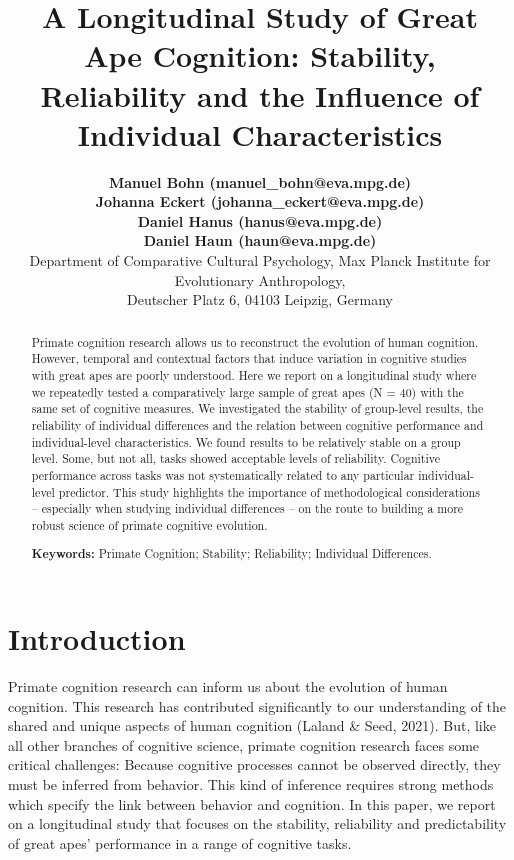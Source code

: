 \documentclass[10pt, letterpaper]{article}
\title{A Longitudinal Study of Great Ape Cognition: Stability, Reliability and
the Influence of Individual Characteristics}
\author{{\large \bf Manuel Bohn (manuel\_bohn@eva.mpg.de)} \\ {\large \bf Johanna Eckert (johanna\_eckert@eva.mpg.de)} \\ {\large \bf Daniel Hanus (hanus@eva.mpg.de)} \\ {\large \bf Daniel Haun (haun@eva.mpg.de)} \\ Department of Comparative Cultural Psychology, Max Planck Institute for Evolutionary Anthropology, \\ Deutscher Platz 6, 04103 Leipzig, Germany}
\begin{document}
\maketitle

\begin{abstract}
Primate cognition research allows us to reconstruct the evolution of
human cognition. However, temporal and contextual factors that induce
variation in cognitive studies with great apes are poorly understood.
Here we report on a longitudinal study where we repeatedly tested a
comparatively large sample of great apes (N = 40) with the same set of
cognitive measures. We investigated the stability of group-level
results, the reliability of individual differences and the relation
between cognitive performance and individual-level characteristics. We
found results to be relatively stable on a group level. Some, but not
all, tasks showed acceptable levels of reliability. Cognitive
performance across tasks was not systematically related to any
particular individual-level predictor. This study highlights the
importance of methodological considerations -- especially when studying
individual differences -- on the route to building a more robust science
of primate cognitive evolution.

\textbf{Keywords:}
Primate Cognition; Stability; Reliability; Individual Differences.
\end{abstract}

\hypertarget{introduction}{%
\section{Introduction}\label{introduction}}

Primate cognition research can inform us about the evolution of human
cognition. This research has contributed significantly to our
understanding of the shared and unique aspects of human cognition
(Laland \& Seed, 2021). But, like all other branches of cognitive
science, primate cognition research faces some critical challenges:
Because cognitive processes cannot be observed directly, they must be
inferred from behavior. This kind of inference requires strong methods
which specify the link between behavior and cognition. In this paper, we
report on a longitudinal study that focuses on the stability,
reliability and predictability of great apes' performance in a range of
cognitive tasks.
\end{document}
